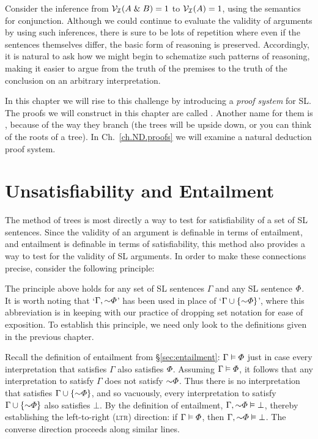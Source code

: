 Consider the inference from $\mathcal{V}_{\mathcal{I}}(A \mathrel\& B)=1$ to $\mathcal{V}_{\mathcal{I}}(A)=1$, using the semantics for conjunction. 
Although we could continue to evaluate the validity of arguments by using such inferences, there is sure to be lots of repetition where even if the sentences themselves differ, the basic form of reasoning is preserved.
Accordingly, it is natural to ask how we might begin to schematize such patterns of reasoning, making it easier to argue from the truth of the premises to the truth of the conclusion on an arbitrary interpretation.

In this chapter we will rise to this challenge by introducing a \emph{proof system} for SL.
The proofs we will construct in this chapter are called .
Another name for them is , because of the way they branch (the trees will be upside down, or you can think of the roots of a tree).
In Ch.\ \ref{ch.ND.proofs} we will examine a natural deduction proof system.





\section{Unsatisfiability and Entailment}

The method of trees is most directly a way to test for satisfiability of a set of SL sentences.
Since the validity of an argument is definable in terms of entailment, and entailment is definable in terms of satisfiability, this method also provides a way to test for the validity of SL arguments.
In order to make these connections precise, consider the following principle:


The principle above holds for any set of SL sentences $\Gamma$ and any SL sentence $\varPhi$. 
It is worth noting that `$\Gamma, \enot \metaA$' has been used in place of `$\Gamma \cup \set{\enot \metaA}$', where this abbreviation is in keeping with our practice of dropping set notation for ease of exposition.
To establish this principle, we need only look to the definitions given in the previous chapter.

Recall the definition of entailment from \S\ref{sec:entailment}: $\Gamma \vDash \varPhi{}$ just in case every interpretation that satisfies $\Gamma$ also satisfies $\varPhi{}$. 
Assuming $\Gamma \vDash \varPhi{}$, it follows that any interpretation to satisfy $\Gamma$ does not satisfy $\enot \metaA$.
Thus there is no interpretation that satisfies $\Gamma \cup \set{\enot \metaA{}}$, and so vacuously, every interpretation to satisfy $\Gamma \cup \set{\enot \metaA{}}$ also satisfies $\bot$.
By the definition of entailment, $\Gamma, \enot \metaA{} \models \bot$, thereby establishing the left-to-right (\textsc{ltr}) direction: if $\Gamma \vDash \varPhi{}$, then $\Gamma, \enot \metaA{} \models \bot$.
The converse direction proceeds along similar lines.

